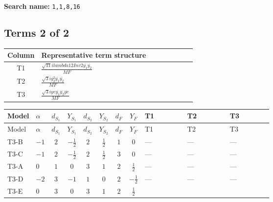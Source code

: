 \documentclass[8pt]{article}
\begin{document}
\begin{landscape}
\begin{longtable}{@{}llcccccc >{\raggedright\arraybackslash}p{0.21\linewidth} >{\raggedright\arraybackslash}p{0.21\linewidth} >{\raggedright\arraybackslash}p{0.21\linewidth}@{}}
\midrule
\bottomrule
\end{longtable}
\clearpage
\noindent\textbf{Search name: }\texttt{1,1,8,16}\par\smallskip
\subsection*{Terms 2 of 2}
\begin{center}
\begin{tabular}{@{}c >{\raggedright\arraybackslash}p{0.82\linewidth}@{}}
\toprule
Column & Representative term structure \\
\midrule
T1 & \(\displaystyle \frac{\sqrt{11} i lambda12Inv2 \overline{y_{1}} \overline{y_{2}}}{MF}\) \\
\midrule
T2 & \(\displaystyle \frac{\sqrt{3} i g_{2}^{2} \overline{y_{1}} \overline{y_{2}}}{MF}\) \\
\midrule
T3 & \(\displaystyle \frac{\sqrt{3} i ye \overline{y_{1}} \overline{y_{2}} \overline{ye}}{MF}\) \\
\midrule
\bottomrule
\end{tabular}
\end{center}
\smallskip
\tiny
\begin{longtable}{@{}llcccccc >{\raggedright\arraybackslash}p{0.21\linewidth} >{\raggedright\arraybackslash}p{0.21\linewidth} >{\raggedright\arraybackslash}p{0.21\linewidth}@{}}
\toprule
Model & $\alpha$ & $d_{S_1}$ & $Y_{S_1}$ & $d_{S_2}$ & $Y_{S_2}$ & $d_F$ & $Y_F$ & T1 & T2 & T3 \\
\midrule
\endfirsthead
\toprule
Model & $\alpha$ & $d_{S_1}$ & $Y_{S_1}$ & $d_{S_2}$ & $Y_{S_2}$ & $d_F$ & $Y_F$ & T1 & T2 & T3 \\
\midrule
\endhead
T3-B & $-1$ & $2$ & $-\frac{1}{2}$ & $2$ & $\frac{1}{2}$ & $1$ & $0$ & --- & --- & --- \\
\midrule
T3-C & $-1$ & $2$ & $-\frac{1}{2}$ & $2$ & $\frac{1}{2}$ & $3$ & $0$ & --- & --- & --- \\
\midrule
T3-A & $0$ & $1$ & $0$ & $3$ & $1$ & $2$ & $\frac{1}{2}$ & --- & --- & --- \\
\midrule
T3-D & $-2$ & $3$ & $-1$ & $1$ & $0$ & $2$ & $-\frac{1}{2}$ & --- & --- & --- \\
\midrule
T3-E & $0$ & $3$ & $0$ & $3$ & $1$ & $2$ & $\frac{1}{2}$ & \scriptsize\adjustbox{max width=\linewidth}{$\begin{gathered} \frac{3 \sqrt{11} i lambda12Inv2 \overline{y_{1}} \overline{y_{2}}}{22 MF}\end{gathered}$} & \scriptsize\adjustbox{max width=\linewidth}{$\begin{gathered} \frac{11 \sqrt{3} i g_{2}^{2} \overline{y_{1}} \overline{y_{2}}}{8 MF}\end{gathered}$} & \scriptsize\adjustbox{max width=\linewidth}{$\begin{gathered} - \frac{\sqrt{3} i ye \overline{y_{1}} \overline{y_{2}} \overline{ye}}{12 MF}\end{gathered}$} \\

\end{longtable}
\end{landscape}
\end{document}
